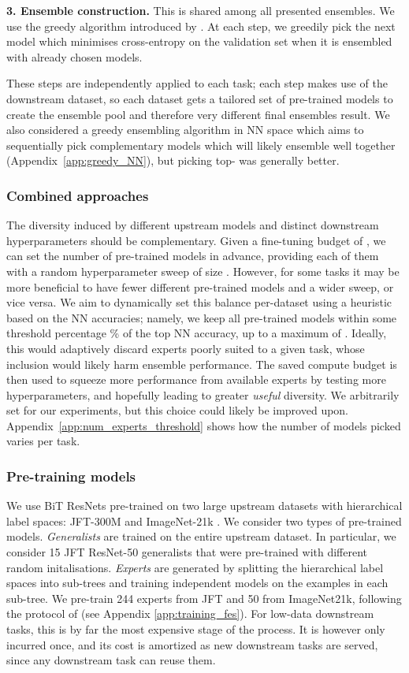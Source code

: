 \documentclass{article} \usepackage{iclr2021_conference,times}
\begin{document}
\textbf{3. Ensemble construction.}
This is shared among all presented ensembles. We use the greedy algorithm introduced by \cite{caruana2004ensembleselection}. At each step, we greedily pick the next model which minimises cross-entropy on the validation set when it is ensembled with already chosen models.

These steps are independently applied to each task; each step makes use of the downstream dataset, so each dataset gets a tailored set of pre-trained models to create the ensemble pool and therefore very different final ensembles result.
We also considered a greedy ensembling algorithm in NN space which aims to sequentially pick complementary models which will likely ensemble well together (Appendix~\ref{app:greedy_NN}), but picking top- was generally better.

\subsubsection{Combined approaches}
\label{sec:combine}
The diversity induced by different upstream models and distinct downstream hyperparameters should be complementary. Given a fine-tuning budget of , we can set the number of pre-trained models  in advance, providing each of them with a random hyperparameter sweep of size .
However, for some tasks it may be more beneficial to have fewer different pre-trained models and a wider sweep, or vice versa. We aim to dynamically set this balance per-dataset using a heuristic based on the NN accuracies; namely, we keep all pre-trained models within some threshold percentage \% of the top NN accuracy, up to a maximum of . Ideally, this would adaptively discard experts poorly suited to a given task, whose inclusion would likely harm ensemble performance. The saved compute budget is then used to squeeze more performance from available experts by testing more hyperparameters, and hopefully leading to greater \emph{useful} diversity.
We arbitrarily set   for our experiments, but this choice could likely be improved upon. Appendix~\ref{app:num_experts_threshold} shows how the number of models picked varies per task.


\subsubsection{Pre-training models}
We use BiT ResNets pre-trained on two large upstream datasets with hierarchical label spaces: JFT-300M \citep{jft300m} and ImageNet-21k \citep{deng2009imagenet}.
We consider two types of pre-trained models.
\emph{Generalists} are trained on the entire upstream dataset. In particular, we consider 15 JFT ResNet-50 generalists that were pre-trained with different random initalisations.
\emph{Experts} are generated by splitting the hierarchical label spaces into sub-trees and training independent models on the examples in each sub-tree. We pre-train 244 experts from JFT and 50 from ImageNet21k, following the protocol of \citep{puigcerver2020experts} (see Appendix \ref{app:training_fes}).
For low-data downstream tasks, this is by far the most expensive stage of the process. It is however only incurred once, and its cost is amortized as new downstream tasks are served, since any downstream task can reuse them.
%
\end{document}
